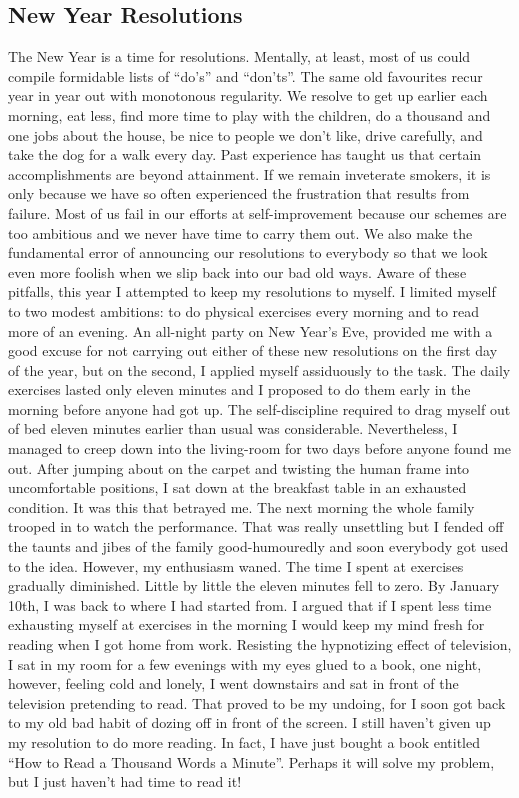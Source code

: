 \documentclass[11pt]{article}
\begin{document}
\subsection{New Year Resolutions}
\label{sec-1-50}

The New Year is a time for resolutions. Mentally, at least, most of us could compile formidable lists of ``do's'' and ``don'ts''. The same old favourites recur year in year out with monotonous regularity. We resolve to get up earlier each morning, eat less, find more time to play with the children, do a thousand and one jobs about the house, be nice to people we don't like, drive carefully, and take the dog for a walk every day. Past experience has taught us that certain accomplishments are beyond attainment. If we remain inveterate smokers, it is only because we have so often experienced the frustration that results from failure. Most of us fail in our efforts at self-improvement because our schemes are too ambitious and we never have time to carry them out. We also make the fundamental error of announcing our resolutions to everybody so that we look even more foolish when we slip back into our bad old ways. Aware of these pitfalls, this year I attempted to keep my resolutions to myself. I limited myself to two modest ambitions: to do physical exercises every morning and to read more of an evening. An all-night party on New Year's Eve, provided me with a good excuse for not carrying out either of these new resolutions on the first day of the year, but on the second, I applied myself assiduously to the task. The daily exercises lasted only eleven minutes and I proposed to do them early in the morning before anyone had got up. The self-discipline required to drag myself out of bed eleven minutes earlier than usual was considerable. Nevertheless, I managed to creep down into the living-room for two days before anyone found me out. After jumping about on the carpet and twisting the human frame into uncomfortable positions, I sat down at the breakfast table in an exhausted condition. It was this that betrayed me. The next morning the whole family trooped in to watch the performance. That was really unsettling but I fended off the taunts and jibes of the family good-humouredly and soon everybody got used to the idea. However, my enthusiasm waned. The time I spent at exercises gradually diminished. Little by little the eleven minutes fell to zero. By January 10th, I was back to where I had started from. I argued that if I spent less time exhausting myself at exercises in the morning I would keep my mind fresh for reading when I got home from work. Resisting the hypnotizing effect of television, I sat in my room for a few evenings with my eyes glued to a book, one night, however, feeling cold and lonely, I went downstairs and sat in front of the television pretending to read. That proved to be my undoing, for I soon got back to my old bad habit of dozing off in front of the screen. I still haven't given up my resolution to do more reading. In fact, I have just bought a book entitled ``How to Read a Thousand Words a Minute''. Perhaps it will solve my problem, but I just haven't had time to read it! 
\end{document}
